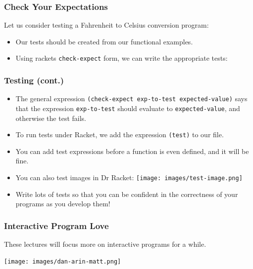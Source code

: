 \documentclass{beamer}
\begin{document}

\begin{frame}
  \frametitle{Check Your Expectations}
  Let us consider testing a Fahrenheit to Celsius conversion program:
  \testProgram
  \begin{itemize}
  \item<2-> Our tests should be created from our functional examples.
  \item<3-> Using rackets \texttt{check-expect} form, we can write the appropriate tests:
    \tests
  \end{itemize}
\end{frame}

\begin{frame}
  \frametitle{Testing (cont.)}
  \begin{itemize}
  \item  The general expression \texttt{(check-expect exp-to-test expected-value)} says that the expression \texttt{exp-to-test}
    should evaluate to \texttt{expected-value}, and otherwise the test fails.
  \item<2-> To run tests under Racket, we add the expression \texttt{(test)} to our file.
  \item<3-> You can add test expressions before a function is even defined, and it will be fine.
  \item<4-> You can also test images in Dr Racket:
    \texttt{[image: images/test-image.png]}
  \item<5-> Write lots of tests so that you can be confident in the correctness of your programs as you develop them!
  \end{itemize}
\end{frame}

\begin{frame}
  \frametitle{Interactive Program Love}
  These lectures will focus more on interactive programs for a while.
  \begin{center}
    \texttt{[image: images/dan-arin-matt.png]}
  \end{center}
\end{frame}
\end{document}

